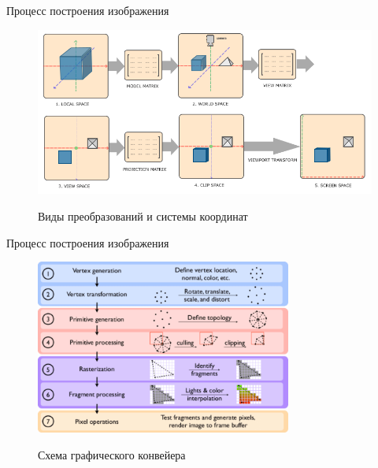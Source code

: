 \documentclass{beamer}
\begin{document}
\begin{frame}{Процесс построения изображения}
	\begin{figure}
		\href{https://learnopengl.com/Getting-started/Coordinate-Systems}{
			\includegraphics[width=\textwidth]{images/Coordinate_systems.png}}
		\caption{Виды преобразований и системы координат}
	\end{figure}

\end{frame}

\begin{frame}{Процесс построения изображения}
	\begin{figure}
		\href{https://www.researchgate.net/figure/Outline-of-the-graphics-pipeline_fig1_281810652}{
			\includegraphics[width=0.75\textwidth]{images/Outline-of-the-graphics-pipeline.png}}
		\caption{Схема графического конвейера}
	\end{figure}
\end{frame}
\end{document}
